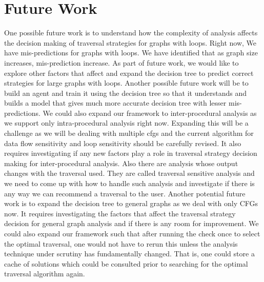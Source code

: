 \section{Future Work}
One possible future work is to understand how the complexity of analysis affects the decision making of traversal strategies for graphs with loops. Right now, We have mis-predictions for graphs with loops. We have identified that as graph size increases, mis-prediction increase. As part of future work, we would like to explore other factors that affect and expand the decision tree to predict correct strategies for large graphs with loops.\newline
Another possible future work will be to build an agent and train it using the decision tree so that it understands and builds a model that gives much more accurate decision tree with lesser mis-predictions.\newline
We could also expand our framework to inter-procedural analysis as we support only intra-procedural analysis right now. Expanding this will be a challenge as we will be dealing with multiple cfgs and the current algorithm for data flow sensitivity and loop sensitivity should be carefully revised. It also requires investigating if any new factors play a role in traversal strategy decision making for inter-procedural analysis.\newline 
Also there are analysis whose output changes with the traversal used. They are called traversal sensitive analysis and we need to come up with how to handle such analysis and investigate if there is any way we can recommend a traversal to the user.\newline
Another potential future work is to expand the decision tree to general graphs as we deal with only CFGs now. It requires investigating the factors that affect the traversal strategy decision for general graph analysis and if there is any room for improvement.\newline
We could also expand our framework such that after running the check once to select the optimal traversal, one would not have to rerun this unless the analysis technique under scrutiny has fundamentally changed. That is, one could store a cache of solutions which could be consulted prior to searching for the optimal traversal algorithm again.